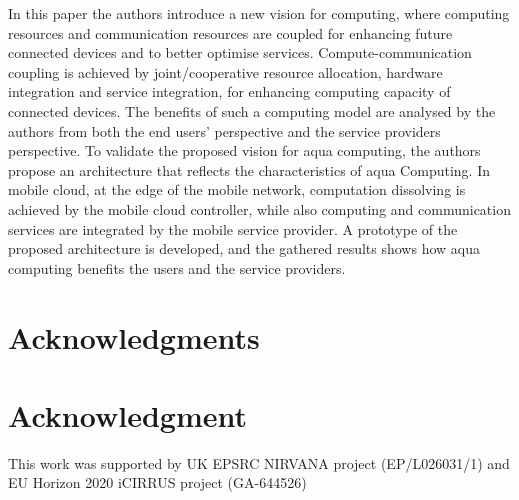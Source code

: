 \documentclass[12pt,journal,compsoc, onecolumn]{IEEEtran}
\begin{document}
In this paper the authors introduce a new vision for computing, where computing resources and communication resources are coupled for enhancing future connected devices and to better optimise services. Compute-communication coupling is achieved by joint/cooperative resource allocation, hardware integration and service integration, for enhancing computing capacity of connected devices. The benefits of such a computing model are analysed by the authors from both the end users' perspective and the service providers perspective. To validate the proposed vision for aqua computing, the authors propose an architecture that reflects the characteristics of aqua Computing. In mobile cloud, at the edge of the mobile network, computation dissolving is achieved by the mobile cloud controller, while also computing and communication services are integrated by the mobile service provider. A prototype of the proposed architecture is developed, and the gathered results shows how aqua computing benefits the users and the service providers.

\ifCLASSOPTIONcompsoc
\section*{Acknowledgments}
\else
\section*{Acknowledgment}
\fi

This work was supported by UK EPSRC NIRVANA project (EP/L026031/1) and EU Horizon 2020 iCIRRUS project (GA-644526)


\ifCLASSOPTIONcaptionsoff
  \newpage
\fi








\end{document}
